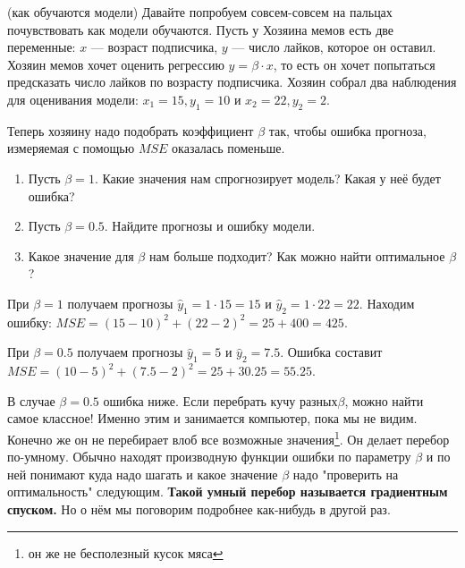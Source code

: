 \documentclass[12pt, a4paper, oneside]{article}
\theoremstyle{plain} %
\theoremstyle{definition}
\newcommand{\indef}[1]{\textbf{ \color{green} #1}}
\begin{document}
\begin{problem}{(как обучаются модели)}
Давайте попробуем совсем-совсем на пальцах почувствовать как модели обучаются. Пусть у Хозяина мемов есть две переменные: $x$ --- возраст подписчика, $y$ --- число лайков, которое он оставил. Хозяин мемов хочет оценить регрессию $y = \beta \cdot x$, то есть он хочет попытаться предсказать число лайков по возрасту подписчика. Хозяин собрал два наблюдения для оценивания модели: $x_1 = 15, y_1 = 10$ и $x_2 = 22, y_2 = 2$.

Теперь хозяину надо подобрать коэффициент $\beta$ так, чтобы ошибка прогноза, измеряемая с помощью $MSE$ оказалась поменьше. 

\begin{enumerate} 
	\item  Пусть $\beta = 1$. Какие значения нам спрогнозирует модель? Какая у неё будет ошибка? 
	
	\item Пусть $\beta = 0.5$. Найдите прогнозы и ошибку модели. 
	
	\item  Какое значение для $\beta$ нам больше подходит? Как можно найти оптимальное $\beta$? 
\end{enumerate}  
\end{problem} 

\begin{solution}
	При $\beta = 1$ получаем прогнозы $\hat y_1 = 1 \cdot 15 = 15$ и  $\hat y_2 = 1 \cdot 22 = 22$. Находим ошибку: $MSE = (15 - 10)^2 + (22 - 2)^2 = 25 + 400 = 425$. 
	
	При $\beta = 0.5$ получаем прогнозы $\hat y_1 = 5$ и $\hat y_2 = 7.5$. Ошибка составит $MSE = (10 - 5)^2 + (7.5 -2)^2 = 25 + 30.25 = 55.25$. 
	
	В случае $\beta = 0.5$ ошибка ниже. Если перебрать кучу разных$\beta$, можно найти самое классное! Именно этим и занимается компьютер, пока мы не видим. Конечно же он не перебирает влоб все возможные значения\footnote{он же не бесполезный кусок мяса}. Он делает перебор по-умному. Обычно находят производную функции ошибки по параметру $\beta$ и по ней понимают куда надо шагать и какое значение $\beta$ надо "проверить на оптимальность" следующим. \indef{Такой умный перебор называется градиентным спуском.}  Но о нём мы поговорим подробнее как-нибудь в другой раз.
\end{solution}
\end{document}
